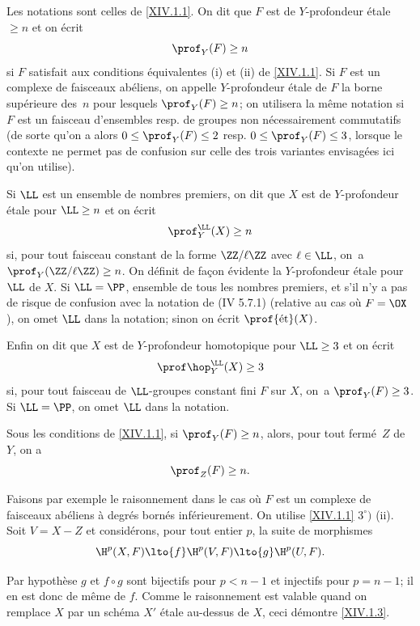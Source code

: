 \begin{definition} \label{XIV.1.2}
Les notations sont celles de \ref{XIV.1.1}. On dit que $F$ est de $Y$-profondeur \'etale $\geq n$ et on \'ecrit
$$
\prof_Y(F)\geq n$$
si $F$ satisfait aux conditions \'equivalentes \textup{(i)} et \textup{(ii)} de \ref{XIV.1.1}. Si $F$ est un complexe de faisceaux ab\'eliens, on appelle $Y$-profondeur \'etale de $F$ la borne sup\'erieure des~$n$ pour lesquels $\prof_Y(F)\geq n$; on utilisera la m\^eme notation si $F$ est un faisceau d'ensembles resp. de groupes non n\'ecessairement commutatifs (de sorte qu'on a alors $0\leq \prof_Y(F)\leq 2$ resp. $0\leq \prof_Y(F)\leq 3$, lorsque le contexte ne permet pas de confusion sur celle des trois variantes envisag\'ees ici qu'on utilise).

Si $\LL$ est un ensemble de nombres premiers, on dit que $X$ est de $Y$-profondeur \'etale pour $\LL \geq n$ et on \'ecrit
$$
\prof_Y^{\LL}(X)\geq n
$$
si, pour tout faisceau constant de la forme $\ZZ/\ell\ZZ$ avec $\ell\in \LL$, on~a $\prof_Y(\ZZ/\ell\ZZ)\geq n$. On d\'efinit de fa\c con \'evidente la $Y$-profondeur \'etale pour $\LL$ de $X$. Si $\LL=\PP$, ensemble de tous les nombres premiers, et s'il n'y a pas de risque de confusion avec la notation de \textup{(\EGA IV 5.7.1)} (relative au cas o\`u $F=\OX$), on omet $\LL$ dans la notation; sinon on \'ecrit $\prof {\textup{ét}}(X)$.

Enfin on dit que $X$ est de $Y$-profondeur homotopique \ignorespaces pour $\LL \geq 3$ et on \'ecrit
$$
\prof \hop_Y^{\LL}(X)\geq 3$$
si, pour tout faisceau de $\LL$-groupes constant fini $F$ sur $X$, on~a $\prof_Y(F)\geq 3$. Si $\LL=\PP$, on omet $\LL$ dans la notation.
\end{definition}

\begin{corollaire} \label{XIV.1.3}
Sous les conditions de \ref{XIV.1.1}, si $\prof_Y(F)\geq n$, alors, pour tout ferm\'e~$Z$ de $Y$, on a
$$
\prof_Z(F)\geq n.
$$
\end{corollaire}

Faisons par exemple le raisonnement dans le cas o\`u $F$ est un complexe de faisceaux ab\'eliens \`a degr\'es born\'es inf\'erieurement. On utilise \ref{XIV.1.1} $3^\circ)$ \textup{(ii)}. Soit $V=X-Z$ et consid\'erons, pour tout entier $p$, la suite de morphismes
$$
\H^p(X, F)\lto{f} \H^p(V, F)\lto{g} \H^p(U, F).
$$

Par hypoth\`ese $g$ et $f\circ g$ sont bijectifs pour $p<n-1$ et injectifs pour $p=n-1$; il en est donc de m\^eme de $f$. Comme le raisonnement est valable quand on remplace $X$ par un sch\'ema $X'$ \'etale au-dessus de $X$, ceci d\'emontre \ref{XIV.1.3}.

